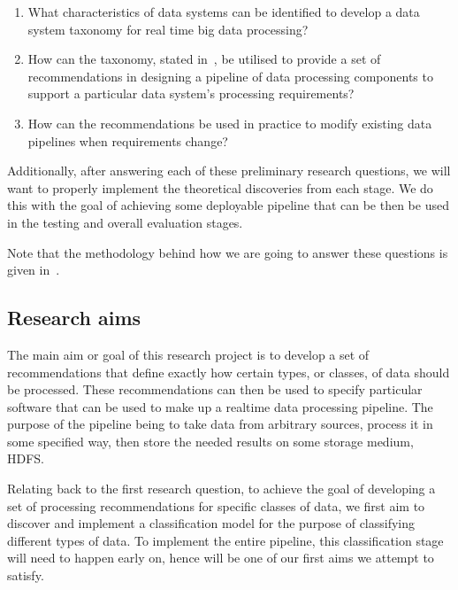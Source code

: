 \documentclass[a4paper,11pt]{article}
\begin{document}
\begin{enumerate}
  \item\label{item:taxonomy} What characteristics of data systems can be identified to develop a data system taxonomy
  for real time big data processing?
  \item\label{item:recommendations} How can the taxonomy, stated in~, be utilised to provide a set
  of recommendations in designing a pipeline of data processing components to support a particular data system's
  processing requirements?
  \item\label{item:pipeline} How can the recommendations be used in practice to modify existing data pipelines when
  requirements change?
\end{enumerate}

Additionally, after answering each of these preliminary research questions, we will want to properly implement the
theoretical discoveries from each stage. We do this with the goal of achieving some deployable pipeline that can be then
be used in the testing and overall evaluation stages.

Note that the methodology behind how we are going to answer these questions is given in~.



\subsection{Research aims} %
\label{sub:research_aims}

The main aim or goal of this research project is to develop a set of recommendations that define exactly how certain
types, or classes, of data should be processed. These recommendations can then be used to specify particular software
that can be used to make up a realtime data processing pipeline. The purpose of the pipeline being to take data from
arbitrary sources, process it in some specified way, then store the needed results on some storage medium, \eg HDFS.

Relating back to the first research question, to achieve the goal of developing a set of processing recommendations for
specific classes of data, we first aim to discover and implement a classification model for the purpose of
classifying different types of data. To implement the entire pipeline, this classification stage will need to happen early
on, hence will be one of our first aims we attempt to satisfy.
\end{document}
